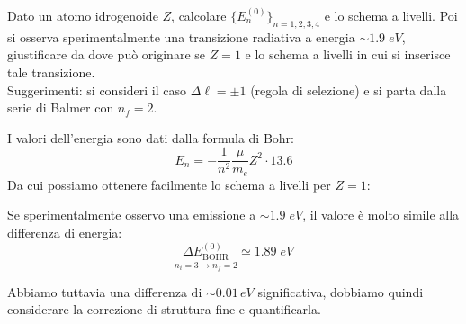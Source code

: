 \begin{exercise}

Dato un atomo idrogenoide \( Z \), calcolare \( \{E_n^{(0)}\}_{n=1,2,3,4} \) e lo schema a livelli.
Poi si osserva sperimentalmente una transizione radiativa a energia \( \sim 1.9 \; eV \), 
giustificare da dove può originare se \( Z=1 \) e lo schema a livelli in cui si inserisce tale transizione.\\
Suggerimenti: si consideri il caso \(\Delta \ell = \pm 1\) (regola di selezione) e si parta dalla serie di Balmer con \(n_f = 2\).

\begin{solution}
I valori dell'energia sono dati dalla formula di Bohr:
\begin{equation}
    E_n = - \frac{1}{n^2} \frac{\mu}{m_e} Z^2 \cdot 13.6
\end{equation}
Da cui possiamo ottenere facilmente lo schema a livelli per \(Z=1\):
\begin{center}
\end{center}
Se sperimentalmente osservo una emissione a \(\sim 1.9\; eV\), il valore è molto simile alla differenza di energia: 
\begin{equation*}
    \underset{n_i=3 \to n_f=2}{\Delta E_{\text{BOHR}}^{(0)}} \simeq 1.89 \;eV
\end{equation*}

Abbiamo tuttavia una differenza di \( \sim 0.01 \,eV\) significativa, dobbiamo quindi considerare la correzione di struttura fine e quantificarla.


\end{solution}
\end{exercise}
